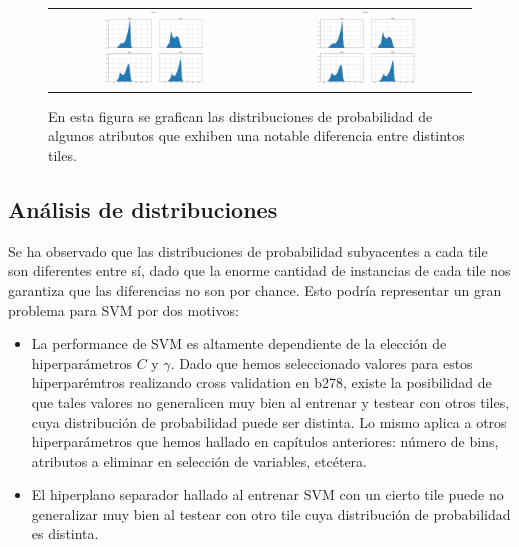 \begin{figure}[h!]
\begin{tabular}{cc}
\includegraphics[width=0.49\textwidth]{Kap6/features/feature_comparison_53.png}   & \includegraphics[width=0.49\textwidth]{Kap6/features/feature_comparison_60.png}  
\end{tabular}
\caption{En esta figura se grafican las distribuciones de probabilidad de algunos atributos que exhiben una notable diferencia entre distintos tiles. }
\label{fig:distribuciones_distintas}
\end{figure}

\subsection{Análisis de distribuciones}
\label{analisis_distribuciones}
Se ha observado que las distribuciones de probabilidad subyacentes a cada tile son diferentes entre sí, dado que la enorme cantidad de instancias de cada tile nos garantiza que las diferencias no son por chance. Esto podría representar un gran problema para SVM por dos motivos:

\begin{itemize}
\item La performance de SVM es altamente dependiente de la elección de hiperparámetros $C$ y $\gamma$. Dado que hemos seleccionado valores para estos hiperparémtros realizando cross validation en b278, existe la posibilidad de que tales valores no generalicen muy bien al entrenar y testear con otros tiles, cuya distribución de probabilidad puede ser distinta. Lo mismo aplica a otros hiperparámetros que hemos hallado en capítulos anteriores: número de bins, atributos a eliminar en selección de variables, etcétera.
\item El hiperplano separador hallado al entrenar SVM con un cierto tile puede no generalizar muy bien al testear con otro tile cuya distribución de probabilidad es distinta.
\end{itemize}

